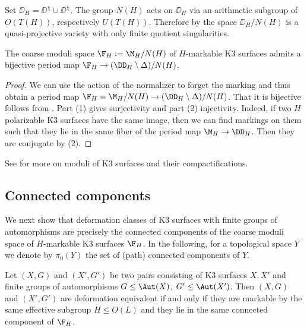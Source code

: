 Set $\DD_H = \DD^\chi \cup \DD^{\bar \chi}$.
The group $N(H)$ acts on $\DD_H$ via an arithmetic subgroup of $O(T(H))$, respectively $U(T(H))$.
Therefore by \cite{baily-borel1966} the space $\DD_H/N(H)$ is a quasi-projective variety with only finite quotient singularities.

\begin{theorem}
 The coarse moduli space $\F_H:=\M_H/N(H)$ of $H$-markable K3 surfaces admits a bijective period map
 $\F_H \to (\DD_H \setminus \Delta)/N(H)$.
\end{theorem}
\begin{proof}
We can use the action of the normalizer to forget the marking and thus obtain a period map $\F_H =\M_H/N(H) \to (\DD_H\setminus \Delta)/N(H)$.
That it is bijective follows from . Part (1) gives surjectivity and part (2) injectivity. Indeed, if two $H$ polarizable K3 surfaces have the same image, then we can find markings on them such that they lie in the same fiber of the period map $\M_H \to \DD_H$. Then they are conjugate by  (2).
\end{proof}
See \cite{alexeev-engel,alexeev-engel-han} for more on moduli of K3 surfaces and their compactifications.

\subsection{Connected components}

We next show that deformation classes of K3 surfaces with
finite groups of automorphisms are precisely the connected components of the coarse moduli space
of $H$-markable K3 surfaces $\F_H$. In the following, for a topological space $Y$ we denote by $\pi_0(Y)$ the set of (path) connected components of $Y$.

\begin{theorem}\label{deformation class vs F_H}
  Let $(X,G)$ and $(X',G')$ be two pairs consisting of K3 surfaces $X, X'$ and finite groups of automorphisms $G \leq \Aut(X)$, $G' \leq \Aut(X')$. Then $(X,G)$ and $(X',G')$ are deformation equivalent if and only if they are markable by the same effective subgroup $H\leq O(L)$ and they lie in the same connected component of $\F_H$.
\end{theorem}

